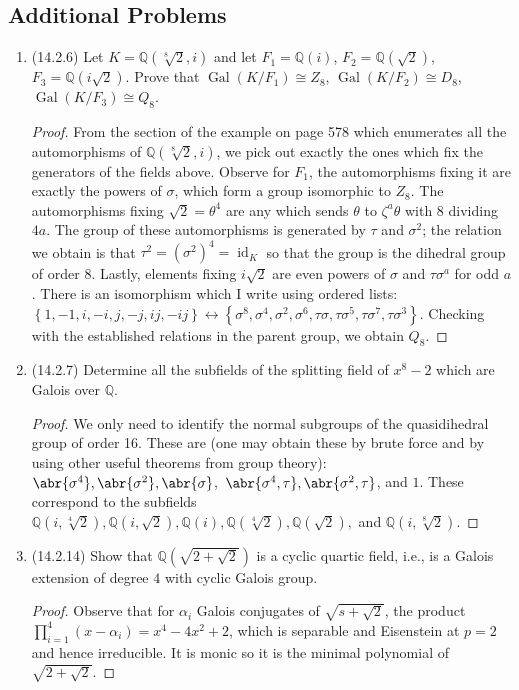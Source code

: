 \documentclass[11pt]{article}
\newcommand{\cbr}[1]{\left\{#1\right\}}
\DeclareMathOperator{\Gal}{Gal}
\DeclareMathOperator{\id}{id}
\begin{document}
\subsection*{Additional Problems}
\begin{enumerate}
    \item (14.2.6) Let $K = \mathbb{Q}(\sqrt[8]{2}, i)$ and let $F_1 = \mathbb{Q}(i)$, $F_2 = \mathbb{Q}(\sqrt{2})$, $F_3 = \mathbb{Q}(i\sqrt{2})$. Prove that $\Gal(K/F_1)\cong Z_8$, $\Gal(K/F_2)\cong D_8$, $\Gal(K/F_3) \cong Q_8$. \begin{proof}
        From the section of the example on page 578 which enumerates all the automorphisms of $\mathbb{Q}(\sqrt[8]{2},i)$, we pick out exactly the ones which fix the generators of the fields above. Observe for $F_1$, the automorphisms fixing it are exactly the powers of $\sigma$, which form a group isomorphic to $Z_8$. The automorphisms fixing $\sqrt{2} = \theta^4$ are any which sends $\theta$ to $\zeta^a\theta$ with $8$ dividing $4a$. The group of these automorphisms is generated by $\tau$ and $\sigma^2$; the relation we obtain is that $\tau^2 = (\sigma^2)^4 = \id_{K}$ so that the group is the dihedral group of order $8$. Lastly, elements fixing $i\sqrt{2}$ are even powers of $\sigma$ and $\tau\sigma^a$ for odd $a$. There is an isomorphism which I write using ordered lists: $\cbr{1,-1,i,-i,j,-j,ij,-ij}\leftrightarrow \cbr{\sigma^8,\sigma^4, \sigma^2, \sigma^6, \tau\sigma, \tau\sigma^5, \tau\sigma^7,\tau\sigma^3}$. Checking with the established relations in the parent group, we obtain $Q_8$.
    \end{proof}
    \item (14.2.7) Determine all the subfields of the splitting field of $x^8-2$ which are Galois over $\mathbb{Q}$. \begin{proof}
        We only need to identify the normal subgroups of the quasidihedral group of order 16. These are (one may obtain these by brute force and by using other useful theorems from group theory): $\abr{\sigma^4},\abr{\sigma^2},\abr{\sigma}$,\ $\abr{\sigma^4,\tau},\abr{\sigma^2,\tau}$, and $1$. These correspond to the subfields $\mathbb{Q}(i,\sqrt[4]{2}),\mathbb{Q}(i,\sqrt{2}),\mathbb{Q}(i),\mathbb{Q}(\sqrt[4]{2}),\mathbb{Q}(\sqrt{2}),$ and $\mathbb{Q}(i,\sqrt[8]{2})$.
    \end{proof}
    \item (14.2.14) Show that $\mathbb{Q}(\sqrt{2+\sqrt{2}})$ is a cyclic quartic field, i.e., is a Galois extension of degree $4$ with cyclic Galois group. \begin{proof}
        Observe that for $\alpha_i$ Galois conjugates of $\sqrt{s+\sqrt{2}}$, the product $\prod_{i=1}^4(x-\alpha_i) = x^4-4x^2+2$, which is separable and Eisenstein at $p=2$ and hence irreducible. It is monic so it is the minimal polynomial of $\sqrt{2+\sqrt{2}}$.
        

\end{proof}
\end{enumerate}
\end{document}
